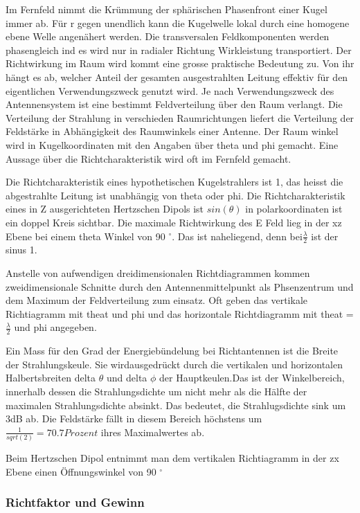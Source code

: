 Im Fernfeld nimmt die Krümmung der sphärischen Phasenfront einer Kugel immer ab. Für r gegen unendlich kann die Kugelwelle lokal durch eine homogene ebene Welle angenähert werden. Die transversalen Feldkomponenten werden phasengleich ind es wird nur in radialer Richtung Wirkleistung transportiert. Der Richtwirkung im Raum wird kommt eine grosse praktische  Bedeutung zu. Von ihr hängt es ab, welcher Anteil der gesamten ausgestrahlten Leitung effektiv für den eigentlichen Verwendungszweck genutzt wird. Je nach Verwendungszweck des Antennensystem ist eine bestimmt Feldverteilung über den Raum verlangt. Die Verteilung der Strahlung in verschieden Raumrichtungen liefert die Verteilung der Feldstärke in Abhängigkeit des Raumwinkels einer Antenne. Der Raum winkel wird in Kugelkoordinaten mit den Angaben über theta und phi gemacht. Eine Aussage über die Richtcharakteristik wird oft im Fernfeld gemacht.

Die Richtcharakteristik eines hypothetischen Kugelstrahlers ist 1, das heisst die abgestrahlte Leitung ist unabhängig von theta oder phi. Die Richtcharakteristik eines in Z ausgerichteten Hertzschen Dipols ist $sin(\theta) $ in polarkoordinaten ist ein doppel Kreis sichtbar. Die maximale Richtwirkung des E Feld lieg in der xz Ebene bei einem theta Winkel von 90 $^\circ$. Das ist naheliegend, denn bei$\frac{\lambda} {2} $ ist der sinus 1.


Anstelle von aufwendigen dreidimensionalen Richtdiagrammen kommen zweidimensionale Schnitte durch den Antennenmittelpunkt als Phsenzentrum und dem Maximum der Feldverteilung zum einsatz. Oft geben das vertikale Richtiagramm mit theat und phi und das horizontale Richtdiagramm mit theat = $\frac{\lambda} {2} $ und phi angegeben.

Ein Mass für den Grad der Energiebündelung bei Richtantennen ist die Breite der Strahlungskeule. Sie wirdausgedrückt durch die vertikalen und horizontalen Halbertsbreiten delta $\theta$ und delta $\phi$ der Hauptkeulen.Das ist der Winkelbereich, innerhalb dessen die Strahlungsdichte um nicht mehr als die Hälfte der maximalen Strahlungsdichte absinkt. Das bedeutet, die Strahlugsdichte sink um 3dB ab. Die Feldstärke fällt in diesem Bereich höchstens um $\frac{1} {sqrt(2)} =70.7 Prozent $ ihres Maximalwertes ab.

Beim Hertzschen Dipol entnimmt man dem vertikalen Richtiagramm in der zx Ebene einen Öffnungswinkel von  90 $^\circ$ 

\subsubsection{Richtfaktor und Gewinn}










